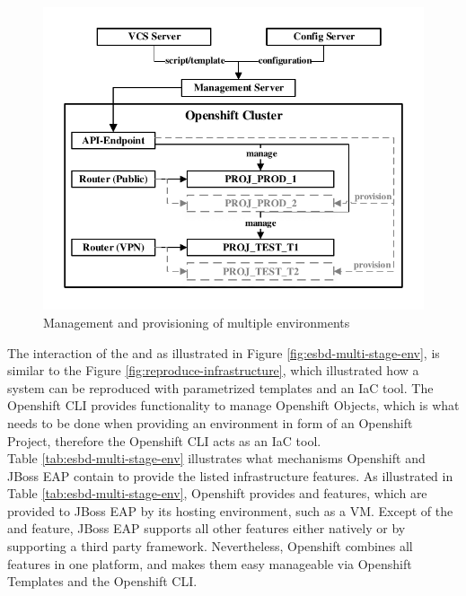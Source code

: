 \begin{figure}[htbp]
	\centering
	\includegraphics[scale=1]{images/esbd-multi-stage-env.pdf}
	\caption{Management and provisioning of multiple environments}
	\label{fig:esbd-multi-stage-env}
\end{figure}

The interaction of the  and  as illustrated in Figure \vref{fig:esbd-multi-stage-env}, is similar to the Figure \vref{fig:reproduce-infrastructure}, which illustrated how a system can be reproduced with parametrized templates and an IaC tool. The Openshift CLI provides functionality to manage Openshift Objects, which is what needs to be done when providing an environment in form of an Openshift Project, therefore the Openshift CLI acts as an IaC tool.  \\

Table \vref{tab:esbd-multi-stage-env} illustrates what mechanisms Openshift and JBoss EAP contain to provide the listed infrastructure features. As illustrated in Table \vref{tab:esbd-multi-stage-env}, Openshift provides  and  features, which are provided to JBoss EAP by its hosting environment, such as a VM. Except of the  and  feature, JBoss EAP supports all other features either natively or by supporting a third party framework. Nevertheless, Openshift combines all features in one platform, and makes them easy manageable via Openshift Templates and the Openshift CLI. \\

